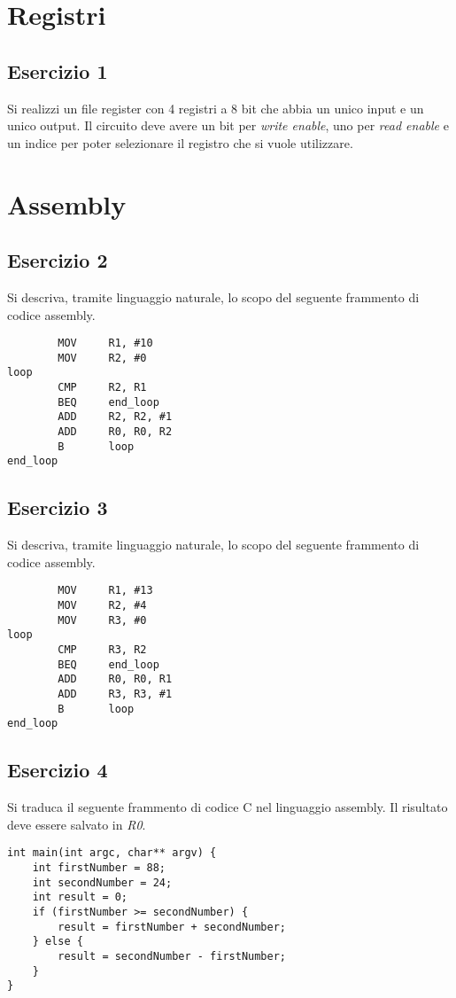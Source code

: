 \documentclass{article}
\begin{document}
\section*{Registri}
\subsection*{Esercizio 1}
Si realizzi un file register con 4 registri a 8 bit che abbia un unico input e un unico output. Il circuito deve avere un bit per \textit{write enable}, uno per \textit{read enable} e un indice per poter selezionare il registro che si vuole utilizzare.

\section*{Assembly}
\subsection*{Esercizio 2}
Si descriva, tramite linguaggio naturale, lo scopo del seguente frammento di codice assembly.
\begin{lstlisting}
		MOV		R1, #10
		MOV		R2, #0
loop
		CMP		R2, R1
		BEQ		end_loop
		ADD		R2, R2, #1
		ADD		R0, R0, R2
		B		loop
end_loop
\end{lstlisting}

\subsection*{Esercizio 3}
Si descriva, tramite linguaggio naturale, lo scopo del seguente frammento di codice assembly.
\begin{lstlisting}
		MOV		R1, #13
		MOV		R2, #4
		MOV		R3, #0
loop
		CMP		R3, R2
		BEQ		end_loop
		ADD		R0, R0, R1
		ADD		R3, R3, #1
		B		loop
end_loop
\end{lstlisting}

\subsection*{Esercizio 4}
Si traduca il seguente frammento di codice C nel linguaggio assembly. Il risultato deve essere salvato in \textit{R0}.
\begin{lstlisting}
int main(int argc, char** argv) {
	int firstNumber = 88;
	int secondNumber = 24;
	int result = 0;
	if (firstNumber >= secondNumber) {
		result = firstNumber + secondNumber;
	} else {
		result = secondNumber - firstNumber;
	}
}
\end{lstlisting}
\end{document}
